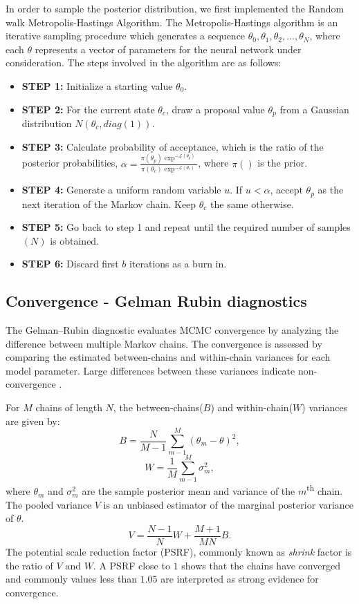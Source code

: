 \documentclass[review]{siamart190516}
\begin{document}
In order to sample the posterior distribution, we first implemented the Random walk Metropolis-Hastings Algorithm. The Metropolis-Hastings algorithm is an iterative sampling procedure which generates a sequence $\theta_0,\theta_1,\theta_2,...,\theta_N$, where each $\theta$ represents a vector of parameters for the neural network under consideration. The steps involved in the algorithm are as follows:
\begin{itemize}
    \item \textbf{STEP 1:} Initialize a starting value $\theta_0$. 
    \item \textbf{STEP 2:} For the current state $\theta_c$, draw a proposal value $\theta_p$ from a Gaussian distribution $N(\theta_c,diag(1))$.
    \item \textbf{STEP 3:} Calculate probability of acceptance, which is the ratio of the posterior probabilities, $\alpha = \frac{\pi(\theta_p)\exp^{-\mathcal{L}(\theta_p)}}{\pi(\theta_c)\exp^{-\mathcal{L}(\theta_c)}}$, where $\pi()$ is the prior.
    \item \textbf{STEP 4:} Generate a uniform random variable $u$. If $u< \alpha$, accept $\theta_p$ as the next iteration of the Markov chain. Keep $\theta_c$ the same otherwise.
    \item \textbf{STEP 5:} Go back to step 1 and repeat until the required number of samples $(N)$ is obtained.
    \item \textbf{STEP 6:} Discard first $b$ iterations as a burn in.
\end{itemize}

\subsection{Convergence - Gelman Rubin diagnostics}
The Gelman–Rubin diagnostic evaluates MCMC convergence by analyzing the difference between multiple Markov chains. The convergence is assessed by comparing the estimated between-chains and within-chain variances for each model parameter. Large differences between these variances indicate non-convergence \cite{brooks_general_1998}. 

For $M$ chains of length $N$, the between-chains($B$) and within-chain($W$) variances are given by:
\begin{equation}
    B = \frac{N}{M-1} \sum_{m-1}^M (\theta_m-\theta)^2,
\end{equation}
\begin{equation}
    W = \frac{1}{M} \sum_{m-1}^M \sigma_m^2,
\end{equation}
where $\theta_m$ and $\sigma_m^2$ are the sample posterior mean and variance of the $m$\textsuperscript{th} chain. The pooled variance $V$ \cite{gelman_inference_1992} is an unbiased estimator of the marginal posterior variance of $\theta$.
\begin{equation}
V = \frac{N-1}{N}W + \frac{M+1}{MN}B.  
\end{equation}
The potential scale reduction factor (PSRF), commonly known as \textit{shrink} factor is the ratio of $V$ and $W$. A PSRF close to $1$ shows that the chains have converged and commonly values less than $1.05$ are interpreted as strong evidence for convergence.
\end{document}
